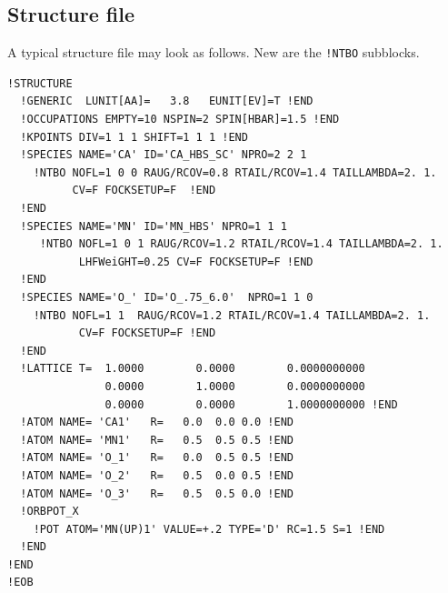 \documentclass[11pt,a4paper]{report}
\begin{document}
\subsection{Structure file}
A typical structure file may look as follows. New are the \verb|!NTBO|
subblocks.
\begin{verbatim}
!STRUCTURE 
  !GENERIC  LUNIT[AA]=   3.8   EUNIT[EV]=T !END
  !OCCUPATIONS EMPTY=10 NSPIN=2 SPIN[HBAR]=1.5 !END
  !KPOINTS DIV=1 1 1 SHIFT=1 1 1 !END
  !SPECIES NAME='CA' ID='CA_HBS_SC' NPRO=2 2 1 
    !NTBO NOFL=1 0 0 RAUG/RCOV=0.8 RTAIL/RCOV=1.4 TAILLAMBDA=2. 1.
          CV=F FOCKSETUP=F  !END 
  !END
  !SPECIES NAME='MN' ID='MN_HBS' NPRO=1 1 1 
     !NTBO NOFL=1 0 1 RAUG/RCOV=1.2 RTAIL/RCOV=1.4 TAILLAMBDA=2. 1.
           LHFWeiGHT=0.25 CV=F FOCKSETUP=F !END 
  !END
  !SPECIES NAME='O_' ID='O_.75_6.0'  NPRO=1 1 0
    !NTBO NOFL=1 1  RAUG/RCOV=1.2 RTAIL/RCOV=1.4 TAILLAMBDA=2. 1.
           CV=F FOCKSETUP=F !END 
  !END
  !LATTICE T=  1.0000        0.0000        0.0000000000
               0.0000        1.0000        0.0000000000
               0.0000        0.0000        1.0000000000 !END
  !ATOM NAME= 'CA1'   R=   0.0  0.0 0.0 !END
  !ATOM NAME= 'MN1'   R=   0.5  0.5 0.5 !END
  !ATOM NAME= 'O_1'   R=   0.0  0.5 0.5 !END
  !ATOM NAME= 'O_2'   R=   0.5  0.0 0.5 !END
  !ATOM NAME= 'O_3'   R=   0.5  0.5 0.0 !END
  !ORBPOT_X
    !POT ATOM='MN(UP)1' VALUE=+.2 TYPE='D' RC=1.5 S=1 !END
  !END
!END 
!EOB
\end{verbatim}



\end{document}

